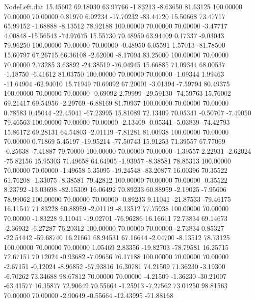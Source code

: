 \begin{filecontents}{NodeLeft.dat}
  15.45602   69.18030   63.97766    -1.83213   -8.63650   81.63125  100.00000   70.00000   70.00000    0.81970    6.02234  -17.70232  -83.44720
  15.50668   73.47717   65.99152    -1.68888   -8.13512   78.92188  100.00000   70.00000   70.00000   -3.47717    4.00848  -15.56543  -74.97675
  15.55730   70.48950   63.94409     0.17337   -9.03043   79.96250  100.00000   70.00000   70.00000   -0.48950    6.05591    1.57013  -81.78500
  15.60797   67.26715   66.36108    -2.62000   -8.17094   83.25000  100.00000   70.00000   70.00000    2.73285    3.63892  -24.38519  -76.04945
  15.66885   71.09344   68.00537    -1.18750   -6.41612   81.03750  100.00000   70.00000   70.00000   -1.09344    1.99463  -11.64904  -62.94010
  15.71949   70.69092   67.20001    -3.01394   -7.59794   80.49375  100.00000   70.00000   70.00000   -0.69092    2.79999  -29.59130  -74.59763
  15.76002   69.21417   69.54956    -2.29769   -6.88169   81.70937  100.00000   70.00000   70.00000    0.78583    0.45044  -22.45041  -67.23995
  15.81089   72.13409   70.05341    -0.50707   -7.49050   79.46563  100.00000   70.00000   70.00000   -2.13409   -0.05341   -5.03839  -74.42793
  15.86172   69.28131   64.54803    -2.01119   -7.81281   81.00938  100.00000   70.00000   70.00000    0.71869    5.45197  -19.95214  -77.50743
  15.91253   71.39557   67.77069    -0.25638   -7.41887   79.70000  100.00000   70.00000   70.00000   -1.39557    2.22931   -2.62024  -75.82156
  15.95303   71.49658   64.64905    -1.93957   -8.38581   78.85313  100.00000   70.00000   70.00000   -1.49658    5.35095  -19.24548  -83.20877
  16.00396   70.35522   61.76208    -1.33075   -8.38581   79.42812  100.00000   70.00000   70.00000   -0.35522    8.23792  -13.03698  -82.15309
  16.06492   70.89233   60.88959    -2.19025   -7.95606   78.99062  100.00000   70.00000   70.00000   -0.89233    9.11041  -21.87533  -79.46175
  16.11547   71.83228   60.88959    -2.01119   -8.13512   77.75938  100.00000   70.00000   70.00000   -1.83228    9.11041  -19.02701  -76.96286
  16.16611   72.73834   69.14673    -2.36932   -6.27287   76.20312  100.00000   70.00000   70.00000   -2.73834    0.85327  -22.54442  -59.68740
  16.21661   68.94531   67.16644    -2.04700   -8.13512   78.73125  100.00000   70.00000   70.00000    1.05469    2.83356  -19.82703  -78.79581
  16.25715   72.67151   70.12024    -0.93682   -7.09656   76.17188  100.00000   70.00000   70.00000   -2.67151   -0.12024   -8.96852  -67.93816
  16.30781   74.21509   71.36230    -3.19300   -6.70262   73.34688   98.67812   70.00000   70.00000   -4.21509   -1.36230  -30.21007  -63.41577
  16.35877   72.90649   70.55664    -1.25913   -7.27562   73.01250   98.81563   70.00000   70.00000   -2.90649   -0.55664  -12.43995  -71.88168

\end{filecontents}
